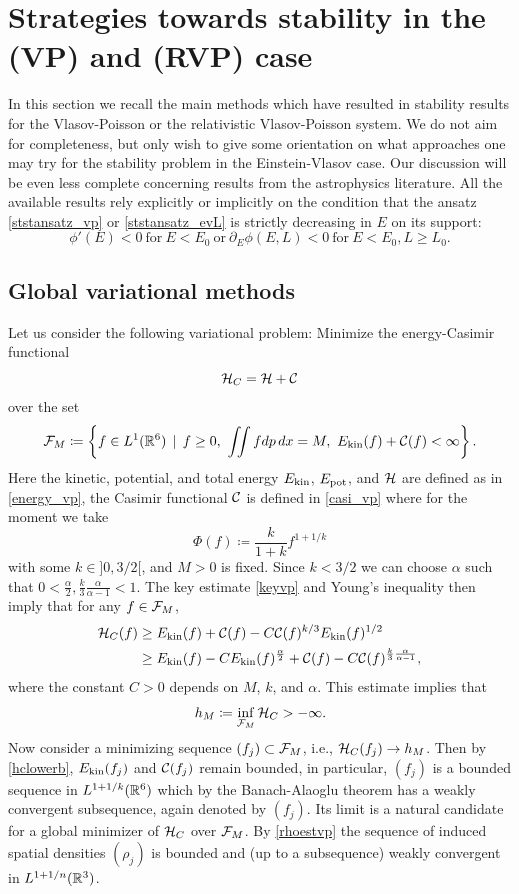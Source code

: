 \documentclass[11pt]{article}
\begin{document}
\section{Strategies towards stability in the (VP) and (RVP) case}
\label{stabstrat}
\setcounter{equation}{0}
%
%
In this section we recall the main methods which have resulted in stability
results for the Vlasov-Poisson or the relativistic Vlasov-Poisson system.
We do not aim for completeness, but only wish to give some orientation
on what approaches one may try for the stability problem in the
Einstein-Vlasov case. Our discussion will be even less complete concerning
results from the astrophysics literature. All the available results rely
explicitly or implicitly on the condition that the ansatz
\eqref{ststansatz_vp} or \eqref{ststansatz_evL} is strictly
decreasing in $E$ on its support:
\begin{equation}\label{mainstabcond}
  \phi'(E) < 0\ \mbox{for}\ E<E_0\ \mbox{or}\
  \partial_E \phi(E,L) < 0\ \mbox{for}\ E<E_0, L\geq L_0.
\end{equation}
%
\subsection{Global variational methods}
\label{globvar_vp}
%
Let us consider the following variational problem:
Minimize the energy-Casimir functional
\[
{\cal H}_C = {\cal H} + {\cal C}
\]
over the set
\[
{\cal F}_M \coloneqq\left\{ f \in L^1(\mathbb R^6)\, \mid \, f\geq 0,\
\iint f dp\,dx = M,\  E_\mathrm{kin}(f) + {\cal C}(f) < \infty \right\}.
\]
Here the kinetic, potential, and total energy $E_\mathrm{kin}$, $E_\mathrm{pot}$, and ${\cal H}$
are defined as in \eqref{energy_vp}, the Casimir functional ${\cal C}$ is defined
in \eqref{casi_vp} where for the moment we take
\begin{equation} \label{polyPsi}
  \Phi(f)\coloneqq\frac{k}{1+k} f^{1+1/k}
\end{equation}
with some $k\in ]0,3/2[$, and $M>0$ is fixed.
Since $k<3/2$ we can choose $\alpha$ such that
$0<\frac{\alpha}{2},\frac{k}{3}\frac{\alpha}{\alpha-1} < 1$.
The key estimate \eqref{keyvp}
and Young's inequality then imply that for any $f\in{\cal F}_M$,
\begin{align}\label{hclowerb}
  {\cal H}_C(f)
  &\geq
  E_\mathrm{kin}(f) + {\cal C}(f) - C {\cal C}(f)^{k/3} E_\mathrm{kin}(f)^{1/2} \notag \\
  &\geq
  E_\mathrm{kin}(f) - C E_\mathrm{kin}(f)^{\frac{\alpha}{2}} +
  {\cal C}(f) - C {\cal C}(f)^{\frac{k}{3}\frac{\alpha}{\alpha-1}},
\end{align}
where the constant $C>0$ depends on $M$, $k$, and $\alpha$.
This estimate implies that
\[
h_M\coloneqq\inf_{{\cal F}_M}{\cal H}_C > -\infty.
\]
Now consider a minimizing sequence $(f_j)\subset {\cal F}_M$, i.e.,
${\cal H}_C(f_j) \to h_M$.
Then by \eqref{hclowerb}, $E_\mathrm{kin}(f_j)$ and ${\cal C}(f_j)$ remain bounded,
in particular, $(f_j)$ is a bounded sequence in $L^{1+1/k}(\mathbb R^6)$ which by the
Banach-Alaoglu theorem has a weakly convergent subsequence,
again denoted by $(f_j)$.
Its limit is a natural candidate for a global minimizer of ${\cal H}_C$ over ${\cal F}_M$. 
By \eqref{rhoestvp} the sequence of induced spatial densities $(\rho_j)$
is bounded and (up to a subsequence) weakly convergent in $L^{1+1/n}(\mathbb R^3)$.
\end{document}
